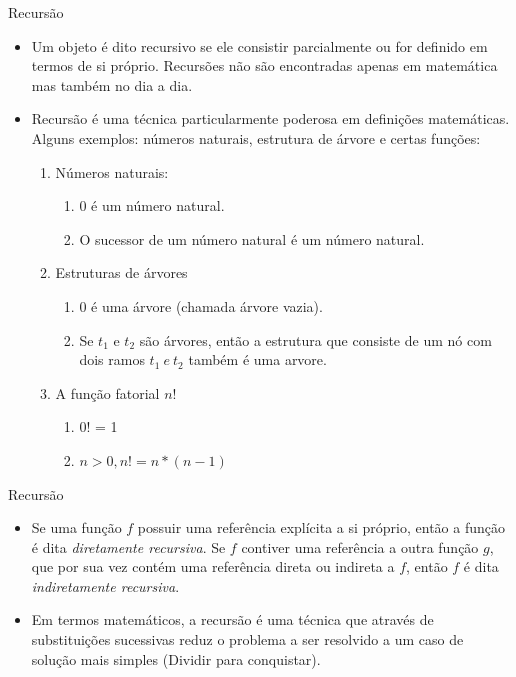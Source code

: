 \begin{frame}[fragile]{Recursão}
\begin{itemize}
	\item Um objeto é dito recursivo se ele consistir parcialmente ou for definido em termos de si próprio. Recursões não são encontradas apenas em matemática mas também no dia a dia. 
	\item Recursão é uma técnica particularmente poderosa em definições matemáticas. Alguns exemplos: números naturais, estrutura de árvore e certas funções:
	
\begin{enumerate}
	\item Números naturais:	
		\begin{enumerate}
			\item 0 é um número natural.
			\item O sucessor de um número natural é um número natural.
		\end{enumerate}
	\item Estruturas de árvores	
		\begin{enumerate}
			\item 0 é uma árvore (chamada árvore vazia).
			\item Se $t_1$ e $t_2$ são árvores, então a estrutura que consiste de um nó com dois ramos $t_1 \ e \ t_2$ também é uma arvore.			
		\end{enumerate}
	\item A função fatorial $n!$
	
\begin{enumerate}
	\item 0! = 1
	\item $n > 0, n! = n * (n - 1)$
\end{enumerate}
\end{enumerate}
\end{itemize}
\end{frame}  

\begin{frame}[fragile]{Recursão}
\begin{itemize}
	\item Se uma função $f$ possuir uma referência explícita a si próprio, então a função é dita \textit{diretamente recursiva}. Se $f$ contiver uma referência a outra função $g$, que por sua vez contém uma referência direta ou indireta a $f$, então $f$ é dita \textit{indiretamente recursiva}.
	\item Em termos matemáticos, a recursão é uma técnica que através de substituições sucessivas reduz o problema a ser resolvido a um caso de solução mais simples (Dividir para conquistar).
\end{itemize}
\end{frame}


